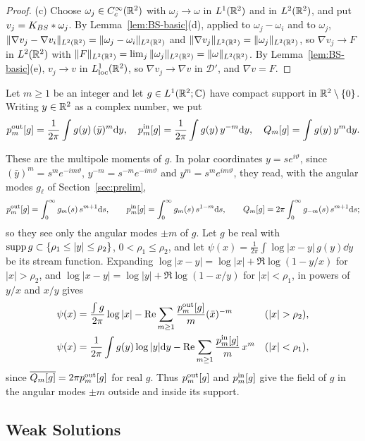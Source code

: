 \begin{proof}
(c) Choose $\omega_j\in C_c^\infty(\mathbb{R}^2)$ with $\omega_j\to\omega$ in $L^1(\mathbb{R}^2)$ and in
$L^2(\mathbb{R}^2)$, and put $v_j=K_{BS}\ast\omega_j$. By Lemma~\ref{lem:BS-basic}(d), applied
to $\omega_j-\omega_i$ and to $\omega_j$, $\|\nabla v_j-\nabla v_i\|_{L^2(\mathbb{R}^2)}=\|\omega_j-\omega_i\|_{L^2(\mathbb{R}^2)}$
and $\|\nabla v_j\|_{L^2(\mathbb{R}^2)}=\|\omega_j\|_{L^2(\mathbb{R}^2)}$, so $\nabla v_j\to F$ in $L^2(\mathbb{R}^2)$ with
$\|F\|_{L^2(\mathbb{R}^2)}=\lim_j\|\omega_j\|_{L^2(\mathbb{R}^2)}=\|\omega\|_{L^2(\mathbb{R}^2)}$. By
Lemma~\ref{lem:BS-basic}(e), $v_j\to v$ in $L^1_{\mathrm{loc}}(\mathbb{R}^2)$, so
$\nabla v_j\to\nabla v$ in $\mathcal D'$, and $\nabla v=F$.
\end{proof}

\begin{definition}
\label{def:multipole}
Let $m\ge1$ be an integer and let $g\in L^1(\mathbb{R}^2;\mathbb{C})$ have compact support in
$\mathbb{R}^2\setminus\{0\}$. Writing $y\in\mathbb{R}^2$ as a complex number, we put
\[
p^{\mathrm{out}}_m[g]=\frac1{2\pi}\int g(y)\,(\bar y)^m\dd y,\quad
p^{\mathrm{in}}_m[g]=\frac1{2\pi}\int g(y)\,y^{-m}\dd y,\quad
Q_m[g]=\int g(y)\,y^{m}\dd y .
\]
\end{definition}

These are the multipole moments of $g$. In polar coordinates $y=se^{i\vartheta}$,
since $(\bar y)^m=s^me^{-im\vartheta}$, $y^{-m}=s^{-m}e^{-im\vartheta}$ and
$y^m=s^me^{im\vartheta}$, they read, with the angular modes $g_\ell$ of
Section~\ref{sec:prelim},
\[
p^{\mathrm{out}}_m[g]=\int_0^\infty g_m(s)\,s^{m+1}\dd s,\qquad
p^{\mathrm{in}}_m[g]=\int_0^\infty g_m(s)\,s^{1-m}\dd s,\qquad
Q_m[g]=2\pi\int_0^\infty g_{-m}(s)\,s^{m+1}\dd s ;
\]
so they see only the angular modes $\pm m$ of $g$. Let $g$ be real with
$\operatorname{supp} g\subset\{\rho_1\le|y|\le\rho_2\}$, $0<\rho_1\le\rho_2$, and let
$\psi(x)=\frac1{2\pi}\int\log|x-y|\,g(y)\dd y$ be its stream function. Expanding
$\log|x-y|=\log|x|+\Re\log(1-y/x)$ for $|x|>\rho_2$, and
$\log|x-y|=\log|y|+\Re\log(1-x/y)$ for $|x|<\rho_1$, in powers of $y/x$ and
$x/y$ gives
\[
\begin{aligned}
\psi(x)&=\frac{\int g}{2\pi}\log|x|-\Re\sum_{m\ge1}\frac{\pout_m[g]}m(\bar x)^{-m}&&(|x|>\rho_2),\\
\psi(x)&=\frac1{2\pi}\int g(y)\log|y|\dd y-\Re\sum_{m\ge1}\frac{\pin_m[g]}m\,x^m&&(|x|<\rho_1),
\end{aligned}
\]
since $\overline{Q_m[g]}=2\pi p^{\mathrm{out}}_m[g]$ for real $g$. Thus $p^{\mathrm{out}}_m[g]$ and
$p^{\mathrm{in}}_m[g]$ give the field of $g$ in the angular modes $\pm m$ outside and inside its
support.

\subsection{Weak Solutions}

